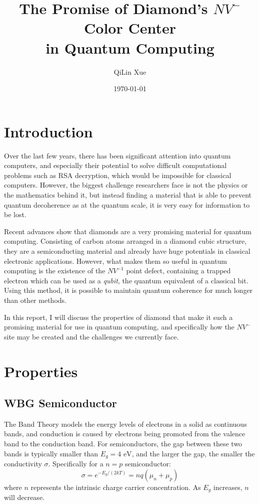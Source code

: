 \documentclass[12pt]{article}
\title{The Promise of Diamond's $NV^{-}$ Color Center \\ in Quantum Computing}
\author{QiLin Xue}
\date{\today}
\begin{document}
    \maketitle
    \tableofcontents
    \newpage
    \section{Introduction}
    Over the last few years, there has been significant attention into quantum computers, and especially their potential to solve difficult computational problems such as RSA decryption, which would be impossible for classical computers\cite{rsa}. However, the biggest challenge researchers face is not the physics or the mathematics behind it, but instead finding a material that is able to prevent quantum decoherence as at the quantum scale, it is very easy for information to be lost.

    Recent advances show that diamonds are a very promising material for quantum computing. Consisting of carbon atoms arranged in a diamond cubic structure, they are a semiconducting material and already have huge potentials in classical electronic applications. However, what makes them so useful in quantum computing is the existence of the $NV^{-1}$ point defect, containing a trapped electron which can be used as a \textit{qubit}, the quantum equivalent of a classical bit. Using this method, it is possible to maintain quantum coherence for much longer than other methods\cite{best}.

    In this report, I will discuss the properties of diamond that make it such a promising material for use in quantum computing, and specifically how the $NV^{-}$ site may be created and the challenges we currently face.
    \section{Properties}
    \subsection{WBG Semiconductor}
    The Band Theory models the energy levels of electrons in a solid as continuous bands, and conduction is caused by electrons being promoted from the valence band to the conduction band. For semiconductors, the gap between these two bands is typically smaller than $E_g = 4\text{ eV}$\cite{Wort2008}, and the larger the gap, the smaller the conductivity $\sigma$. Specifically for a $n=p$ semiconductor:
    \begin{equation}
        \sigma = e^{-E_g/(2kT)} = nq(\mu_n+\mu_p)
    \end{equation}
    where $n$ represents the intrinsic charge carrier concentration. As $E_g$ increases, $n$ will decrease.
    
\end{document}

